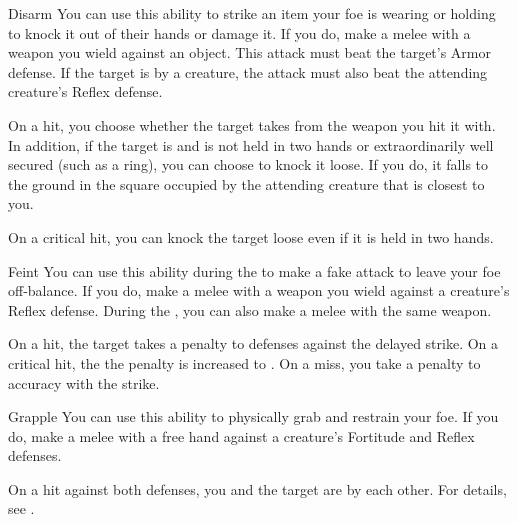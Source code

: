             \begin{ability}{Disarm}\label{Disarm}
                You can use this ability to strike an item your foe is wearing or holding to knock it out of their hands or damage it.
                If you do, make a melee  with a weapon you wield against an object.
                This attack must beat the target's Armor defense.
                If the target is  by a creature, the attack must also beat the attending creature's Reflex defense.

                On a hit, you choose whether the target takes  from the weapon you hit it with.
                In addition, if the target is  and is not held in two hands or extraordinarily well secured (such as a ring), you can choose to knock it loose.
                If you do, it falls to the ground in the square occupied by the attending creature that is closest to you.

                On a critical hit, you can knock the target loose even if it is held in two hands.
            \end{ability}

            \begin{ability}{Feint}\label{Feint}
                You can use this ability during the  to make a fake attack to leave your foe off-balance.
                If you do, make a melee  with a weapon you wield against a creature's Reflex defense.
                During the , you can also make a melee  with the same weapon.

                On a hit, the target takes a  penalty to defenses against the delayed strike.
                On a critical hit, the the penalty is increased to .
                On a miss, you take a  penalty to accuracy with the strike.
            \end{ability}

            \begin{ability}{Grapple}\label{Grapple}
                You can use this ability to physically grab and restrain your foe.
                If you do, make a melee  with a free hand against a creature's Fortitude and Reflex defenses.

                On a hit against both defenses, you and the target are \grappled by each other.
                For details, see .
            \end{ability}

